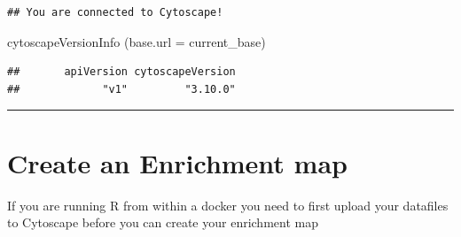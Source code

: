 \documentclass[
]{book}
\newenvironment{Shaded}{\begin{snugshade}}{\end{snugshade}}
\newcommand{\AttributeTok}[1]{\textcolor[rgb]{0.77,0.63,0.00}{#1}}
\newcommand{\FunctionTok}[1]{\textcolor[rgb]{0.00,0.00,0.00}{#1}}
\newcommand{\NormalTok}[1]{#1}
\begin{document}
\begin{verbatim}
## You are connected to Cytoscape!
\end{verbatim}

\begin{Shaded}
\begin{Highlighting}[]
\FunctionTok{cytoscapeVersionInfo}\NormalTok{ (}\AttributeTok{base.url =}\NormalTok{ current\_base)}
\end{Highlighting}
\end{Shaded}

\begin{verbatim}
##       apiVersion cytoscapeVersion 
##             "v1"         "3.10.0"
\end{verbatim}

\begin{center}\rule{0.5\linewidth}{0.5pt}\end{center}

\hypertarget{create-an-enrichment-map-1}{%
\section{Create an Enrichment map}\label{create-an-enrichment-map-1}}

If you are running R from within a docker you need to first upload your datafiles to Cytoscape before you can create your enrichment map
\end{document}
